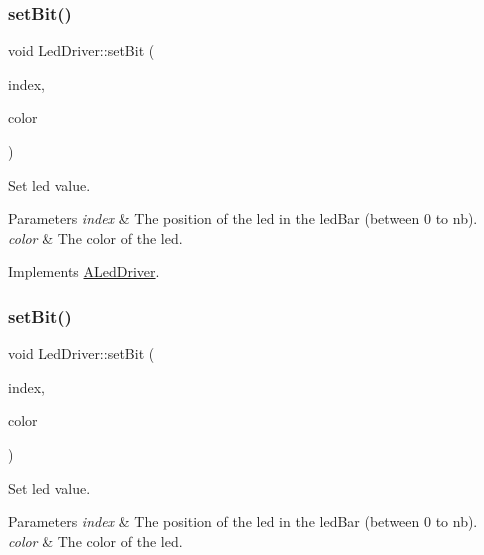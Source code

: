 \subsubsection{\texorpdfstring{set\+Bit()}{setBit()}\hspace{0.1cm}{\footnotesize\ttfamily [1/5]}}
{\footnotesize\ttfamily void Led\+Driver\+::set\+Bit (\begin{DoxyParamCaption}\item[{int}]{index,  }\item[{Led\+Color}]{color }\end{DoxyParamCaption})\hspace{0.3cm}{\ttfamily [virtual]}}



Set led value. 


\begin{DoxyParams}{Parameters}
{\em index} & The position of the led in the led\+Bar (between 0 to nb). \\
\hline
{\em color} & The color of the led. \\
\hline
\end{DoxyParams}


Implements \hyperlink{classALedDriver_acbc8507c36f0f4fa3afb845d81e56eb2}{A\+Led\+Driver}.

\mbox{\label{classLedDriver_af5ec63943cb92b14a887fdd2a5491e93}} 
\subsubsection{\texorpdfstring{set\+Bit()}{setBit()}\hspace{0.1cm}{\footnotesize\ttfamily [2/5]}}
{\footnotesize\ttfamily void Led\+Driver\+::set\+Bit (\begin{DoxyParamCaption}\item[{int}]{index,  }\item[{Led\+Color}]{color }\end{DoxyParamCaption})\hspace{0.3cm}{\ttfamily [virtual]}}



Set led value. 


\begin{DoxyParams}{Parameters}
{\em index} & The position of the led in the led\+Bar (between 0 to nb). \\
\hline
{\em color} & The color of the led. \\
\hline
\end{DoxyParams}


